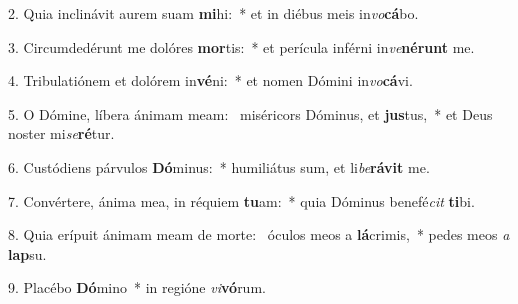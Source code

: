 2. Quia inclinávit aurem suam \textbf{mi}hi:~*  et in diébus meis in\textit{vo}\textbf{cá}bo.\

3. Circumdedérunt me dolóres \textbf{mor}tis:~*  et perícula inférni in\textit{ve}\textbf{né}\textbf{runt} me.\

4. Tribulatiónem et dolórem in\textbf{vé}ni:~*  et nomen Dómini in\textit{vo}\textbf{cá}vi.\

5. O Dómine, líbera ánimam meam: \dag\  miséricors Dóminus, et \textbf{jus}tus,~*  et Deus noster mi\textit{se}\textbf{ré}tur.\

6. Custódiens párvulos \textbf{Dó}minus:~*  humiliátus sum, et li\textit{be}\textbf{rá}\textbf{vit} me.\

7. Convértere, ánima mea, in réquiem \textbf{tu}am:~*  quia Dóminus benefé\textit{cit} \textbf{ti}bi.\

8. Quia erípuit ánimam meam de morte: \dag\  óculos meos a \textbf{lá}crimis,~*  pedes meos \textit{a} \textbf{lap}su.\

9. Placébo \textbf{Dó}mino~*  in regióne \textit{vi}\textbf{vó}rum.\

